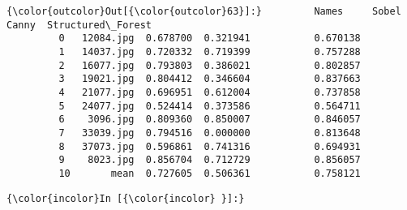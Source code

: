 \documentclass[11pt]{article}
\begin{document}
            \begin{Verbatim}[commandchars=\\\{\}]
{\color{outcolor}Out[{\color{outcolor}63}]:}         Names     Sobel     Canny  Structured\_Forest
         0   12084.jpg  0.678700  0.321941           0.670138
         1   14037.jpg  0.720332  0.719399           0.757288
         2   16077.jpg  0.793803  0.386021           0.802857
         3   19021.jpg  0.804412  0.346604           0.837663
         4   21077.jpg  0.696951  0.612004           0.737858
         5   24077.jpg  0.524414  0.373586           0.564711
         6    3096.jpg  0.809360  0.850007           0.846057
         7   33039.jpg  0.794516  0.000000           0.813648
         8   37073.jpg  0.596861  0.741316           0.694931
         9    8023.jpg  0.856704  0.712729           0.856057
         10       mean  0.727605  0.506361           0.758121
\end{Verbatim}
        
    \begin{Verbatim}[commandchars=\\\{\}]
{\color{incolor}In [{\color{incolor} }]:} 
\end{Verbatim}


    
    
    
    
\end{document}
